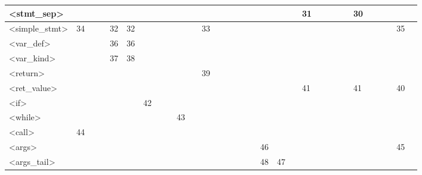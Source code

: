 \begin{tabular}{|l|l|l|l|l|l|l|l|l|l|l|l|l|l|l|l|l|l|l|l|l|l|l|l|l|l|l|l|l|l|l|}
\textless{}stmt\_sep\textgreater{}        &    &        &     &     &     &    &      &      &       &    &        &     &        &        &      &   &    &    &    & 31 &   &   &    &   & 30      &        &        &     &      &    \\ \hline
\rowcolor[HTML]{EEEEEE} 
\textless{}simple\_stmt\textgreater{}     & 34 &        &     & 32  & 32  &    &      &      &       &    & 33     &     &        &        &      &   &    &    &    &    &   &   &    &   &         &        &        &     & 35   &    \\ \hline
\textless{}var\_def\textgreater{}         &    &        &     & 36  & 36  &    &      &      &       &    &        &     &        &        &      &   &    &    &    &    &   &   &    &   &         &        &        &     &      &    \\ \hline
\rowcolor[HTML]{EEEEEE} 
\textless{}var\_kind\textgreater{}        &    &        &     & 37  & 38  &    &      &      &       &    &        &     &        &        &      &   &    &    &    &    &   &   &    &   &         &        &        &     &      &    \\ \hline
\textless{}return\textgreater{}           &    &        &     &     &     &    &      &      &       &    & 39     &     &        &        &      &   &    &    &    &    &   &   &    &   &         &        &        &     &      &    \\ \hline
\rowcolor[HTML]{EEEEEE} 
\textless{}ret\_value\textgreater{}       &    &        &     &     &     &    &      &      &       &    &        &     &        &        &      &   &    &    &    & 41 &   &   &    &   & 41      &        &        &     & 40   &    \\ \hline
\textless{}if\textgreater{}               &    &        &     &     &     & 42 &      &      &       &    &        &     &        &        &      &   &    &    &    &    &   &   &    &   &         &        &        &     &      &    \\ \hline
\rowcolor[HTML]{EEEEEE} 
\textless{}while\textgreater{}            &    &        &     &     &     &    &      &      & 43    &    &        &     &        &        &      &   &    &    &    &    &   &   &    &   &         &        &        &     &      &    \\ \hline
\textless{}call\textgreater{}             & 44 &        &     &     &     &    &      &      &       &    &        &     &        &        &      &   &    &    &    &    &   &   &    &   &         &        &        &     &      &    \\ \hline
\rowcolor[HTML]{EEEEEE} 
\textless{}args\textgreater{}             &    &        &     &     &     &    &      &      &       &    &        &     &        &        &      &   & 46 &    &    &    &   &   &    &   &         &        &        &     & 45   &    \\ \hline
\rowcolor[HTML]{EEEEEE} 
\textless{}args\_tail\textgreater{}       &    &        &     &     &     &    &      &      &       &    &        &     &        &        &      &   & 48 & 47 &    &    &   &   &    &   &         &        &        &     &      &    \\ \hline
\end{tabular}
